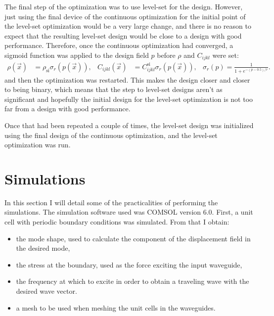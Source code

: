 The final step of the optimization was to use level-set for the design.
However, just using the final device of the continuous optimization for the
initial point of the level-set optimization would be a very large
change, and there is no reason to expect that the resulting level-set design
would be close to a design with good performance.
Therefore, once the continuous optimization had converged, a sigmoid function
was applied to the design field $p$ before $\rho$ and $C_{ijkl}$ were set:
\begin{align}
	\rho(\vec x) &= \rho_\text{si} \sigma_r(p(\vec x)),
	&
	C_{ijkl}(\vec x) &= C_{ijkl}^\text{si} \sigma_r(p(\vec x)),
	&
	\sigma_r(p) = \frac{1}{1+e^{-(p-0.5)/r}}.
\end{align}
and then the optimization was restarted.
This makes the design closer and closer to being binary, which means that the
step to level-set designs aren't as significant and hopefully the initial design
for the level-set optimization is not too far from a design with good performance.

Once that had been repeated a couple of times, the level-set design was
initialized using the final design of the continuous optimization, and the
level-set optimization was run.

\section{Simulations}

In this section I will detail some of the practicalities of performing the
simulations.
The simulation software used was COMSOL version 6.0.
First, a unit cell with periodic boundary conditions was simulated.
From that I obtain:
\begin{itemize}
	\item the mode shape, used to calculate the component of the displacement
		field in the desired mode,
	\item the stress at the boundary, used as the force exciting the input
		waveguide,
	\item the frequency at which to excite in order to obtain a traveling wave
		with the desired wave vector.
	\item a mesh to be used when meshing the unit cells in the waveguides.
\end{itemize}

